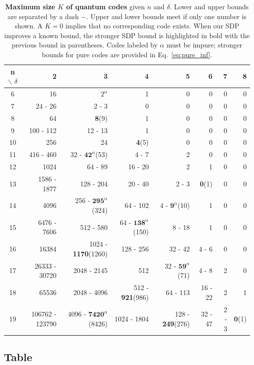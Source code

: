 \documentclass[12pt,a4paper]{amsart}
\begin{document}
\begin{table}[tbp]\label{tab:results}
\vspace{0.3cm}
{\footnotesize
\begin{tabular}{@{} c r r r r r r r @{}}
\toprule 
n $\backslash$ $\delta$ & 2 & 3 & 4 & 5 & 6 & 7 & 8 \\ 
\midrule
6 & 16 & $2^\alpha$ & 1 & 0 & 0 & 0 & 0 \\
7 & 24 - 26 & 2 - 3 & 0 & 0 & 0 & 0 & 0 \\
8 & 64 & \textbf{8}(9) & 1 & 0 & 0 & 0 & 0 \\
9 & 100 - 112 & 12 - 13& 1 & 0 & 0 & 0 & 0  \\
10 & 256 & 24 & \textbf{4}(5) & 0 & 0 & 0 & 0 \\
11 & 416 - 460 & 32 - $\bm{42}^\alpha$(53) & 4 - 7 & 2 & 0 & 0 & 0 \\
12 & 1024 & 64 - 89 & 16 - 20 & 2 & 1 & 0 & 0\\
13 & 1586 - 1877 & 128 - 204 & 20 - 40 & 2 - 3 & \textbf{0}(1) & 0 & 0\\
14 & 4096 & 256 - $\bm{295}^\alpha$(324) & 64 - 102 & 4 - $\bm{9}^\alpha$(10) & 1 & 0 & 0\\ 
15 & 6476 - 7606 & 512 - 580 & 64 - $\bm{138}^\alpha$(150) & 8 - 18 & 1 & 0 & 0\\
16 & 16384 & 1024 - \textbf{1170}(1260) & 128 - 256 & 32 - 42 & 4 - 6 & 0 & 0 \\
17 & 26333 - 30720 & 2048 - 2145 & 512 & 32 - $\bm{59}^\alpha$(71) & 4 - 8 & 2 & 0\\
18 & 65536 & 2048 - 4096 & 512 - \textbf{921}(986) & 64 - 113 & 16 - 22 & 2 & 1 \\
19 & 106762 - 123790 & 4096 - $\bm{7420}^\alpha$(8426) & 1024 - 1804 & 128 - \textbf{249}(276) & 32 - 47 & 2 - 3 & \textbf{0}(1) 
\\
\bottomrule
\end{tabular}
}
\vspace{1cm}
 \caption{{\bf Maximum size $K$ of quantum codes}
given $n$ and $\delta$.
Lower and upper bounds are separated by a dash $-$. 
Upper and lower bounds meet
if only one number is shown.
A $K=0$ implies that no corresponding code exists.
When our SDP improves a known bound, the stronger SDP bound is highlighted in bold with the previous bound in parentheses. Codes labeled by $\alpha$ must be impure; stronger bounds for pure codes are provided in Eq.~\eqref{eq:pure_inf}.}
\end{table} 

\subsection{Table}
\end{document}
